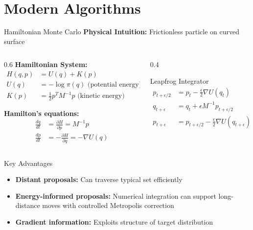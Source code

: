 \documentclass[aspectratio=169,11pt]{beamer}
\begin{document}
\section{Modern Algorithms}

\begin{frame}{Hamiltonian Monte Carlo}
\textbf{Physical Intuition:} Frictionless particle on curved surface

\vspace{0.3cm}
\begin{columns}
\begin{column}{0.6\textwidth}
\textbf{Hamiltonian System:}
\begin{align}
H(q, p) &= U(q) + K(p) \\
U(q) &= -\log \pi(q) \text{ (potential energy)} \\
K(p) &= \frac{1}{2} p^T M^{-1} p \text{ (kinetic energy)}
\end{align}

\textbf{Hamilton's equations:}
\begin{align}
\frac{dq}{dt} &= \frac{\partial H}{\partial p} = M^{-1} p \\
\frac{dp}{dt} &= -\frac{\partial H}{\partial q} = -\nabla U(q)
\end{align}
\end{column}
\begin{column}{0.4\textwidth}
\begin{block}{Leapfrog Integrator}
\begin{align}
p_{t+\epsilon/2} &= p_t - \frac{\epsilon}{2} \nabla U(q_t) \\
q_{t+\epsilon} &= q_t + \epsilon M^{-1} p_{t+\epsilon/2} \\
p_{t+\epsilon} &= p_{t+\epsilon/2} - \frac{\epsilon}{2} \nabla U(q_{t+\epsilon})
\end{align}
\end{block}
\end{column}
\end{columns}

\vspace{0.3cm}
\begin{alertblock}{Key Advantages}
\begin{itemize}
\item \textbf{Distant proposals:} Can traverse typical set efficiently
\item \textbf{Energy-informed proposals:} Numerical integration can support long-distance moves with controlled Metropolis correction
\item \textbf{Gradient information:} Exploits structure of target distribution
\end{itemize}
\end{alertblock}
\end{frame}
\end{document}
